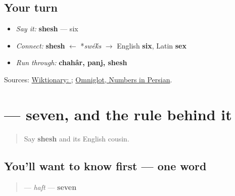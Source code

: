\subsection*{Your turn}
\begin{itemize}
\raggedright
  \item \emph{Say it:} \textbf{shesh} — six
  \item \emph{Connect:} \textbf{shesh} $\leftarrow$ *\emph{swé\'{k}s} $\to$ English \textbf{six}, Latin \textbf{sex}
  \item \emph{Run through:} \textbf{chahâr, panj, shesh}
\end{itemize}

\begin{tcolorbox}[breakable,colback=teal!4,colframe=teal!35!black,title={Before you move on}]
Sources: \href{https://en.wiktionary.org/wiki/\%D8\%B4\%D8\%B4}{Wiktionary: }; \href{https://www.omniglot.com/language/numbers/persian.htm}{Omniglot, Numbers in Persian}.
\end{tcolorbox}
\section[\texorpdfstring{\fa{هفت} (haft)}{هفت (haft)}]{ — seven, and the rule behind it}

\label{lesson:FA-C17-haft}



\begin{quote}
Say \textbf{shesh} and its English cousin.
\end{quote}

\subsection*{You'll want to know first — one word}
\begin{quote}
\textbf{} — \emph{haft} — \textbf{seven}
\end{quote}


